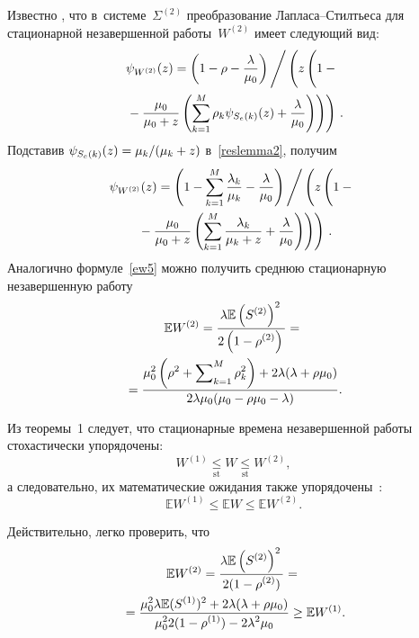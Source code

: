 \begin{multicols}{2}
Известно \cite{mathematics2022}, что в~сис\-те\-ме~$\Sigma^{(2)}$ преобразование 
Лап\-ла\-са--Стилть\-еса для стационарной незавершенной работы~$W^{(2)}$ имеет 
сле\-ду\-ющий вид:
\begin{multline}
\label{reslemma2}
 \psi_{W^{(2)}} (z)=
 \left(1-\rho- \fr{\lambda}{\mu_0}\right) \Bigg/
\left(  z\left(
\vphantom{\left(\sum\limits_{k=1}^M\right)}
1-{}\right.\right.\\
\left.\left.{}-\fr{\mu_0}{\mu_0+z}\left(\sum\limits_{k=1}^M \rho_k \psi_{S_e(k)}(z) +
\fr{\lambda}{\mu_0}\right)\right)\right)\,.
\end{multline}
Подставив $\psi_{S_e(k)}(z) = \mu_k/(\mu_k \hm+z)$ в~\eqref{reslemma2}, получим
\begin{multline*}
\psi_{W^{(2)}} (z)=
\left(1-\sum\limits_{k=1}^M \fr{\lambda_k}{\mu_k}-\fr{\lambda}{\mu_0}\right) \Bigg/
\left(z\left(
\vphantom{\left(\sum\limits_{k=1}^M\right)}
1-{}\right.\right.\\
\left.\left.{}-\fr{\mu_0}{\mu_0+z}\left(\sum\limits_{k=1}^M \fr{\lambda_k}{\mu_k+z}  +\fr{\lambda}{\mu_0}\right)\right)\right)\,.
\end{multline*}
Аналогично формуле~\eqref{ew5} можно получить среднюю стационарную незавершенную 
работу
\begin{multline}
\label{ew6}
\mathbb{E}  W^{(2)} = \displaystyle\frac{\displaystyle \lambda \mathbb{E} \left( S^{(2)}\right)^2\mathstrut}{\displaystyle 2\left(1-\rho^{(2)}\right)\mathstrut} = {}\\
{}=
\displaystyle\frac{\displaystyle \mu_0^2\left(\rho^2 + \sum\nolimits_{k=1}^M \rho_k^2 \right) +2 \lambda (\lambda +\rho \mu_0)\mathstrut}{\displaystyle 2\lambda \mu_0 (\mu_0 -\rho \mu_0 -\lambda)\mathstrut}.
\end{multline}



Из теоремы~1 следует, что
стационарные времена незавершенной работы стохастически упорядочены:
 $$
 W^{(1)}\underset{\mathrm{st}}\le W \underset{\mathrm{st}}\le W^{(2)},
 $$
а следовательно,  их математические ожидания также упорядочены~\cite{Ross}:
$$
 \mathbb{E} W^{(1)}\le \mathbb{E} W \le \mathbb{E} W^{(2)}.
$$

Действительно, легко проверить, что
\begin{multline*}
\mathbb{E}  W^{(2)} = \displaystyle\frac{\displaystyle \lambda \mathbb{E} \left( S^{(2)}\right)^2\mathstrut}{\displaystyle 2(1-\rho^{(2)})\mathstrut} = {}\\
{}=
\displaystyle\frac{\displaystyle \mu_0^2 \lambda \mathbb{E} ( S^{(1)})^2 + 2 \lambda (\lambda +\rho \mu_0)\mathstrut}{\displaystyle \mu_0^2 2(1-\rho^{(1)}) - 2\lambda^2 \mu_0 \mathstrut} 
\ge \mathbb{E}  W^{(1)}.
\end{multline*}



\end{multicols}

